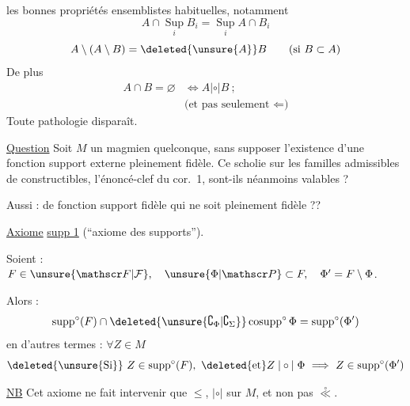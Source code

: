 \clearpage
{}

les bonnes propriétés  ensemblistes habituelles, notamment
\[
A\cap\operatorname*{Sup}_i B_i=\operatorname*{Sup}_i A\cap B_i
\]
\[
A\setminus(A\setminus B)=\deleted{\unsure{A}}B\qquad(\text{si }B\subset A)
\]
De plus 
\[
\begin{aligned}
A\cap B=\varnothing&\Longleftrightarrow A\mathrel{|\circ|}B\ ;\\
&\text{(et pas seulement }\Leftarrow\text{)}
\end{aligned}
\]
Toute pathologie disparaît.

\uline{Question} Soit $M$ un magmien quelconque, sans supposer l'existence d'une fonction support externe pleinement fidèle. Ce scholie sur les familles admissibles de  constructibles,   l'énoncé-clef du cor.\ 1, sont-ils néanmoins valables ?

Aussi :  de fonction support fidèle qui ne soit pleinement fidèle ??

\uline{Axiome} \uline{ supp 1} (``axiome des supports'').

\noindent\vrule\hspace{0.15em}\vrule\hspace{0.6em}\begin{minipage}{0.92\linewidth}
Soient : $F\in\unsure{\mathscr F|\mathcal F},\quad\unsure{\Phi|\mathscr P}\subset F,\quad\Phi'=F\setminus\Phi$.

Alors :
\[
\operatorname{supp}^{\circ}(F)\cap\deleted{\unsure{\complement_{\Phi}|\complement_{\Sigma}}}\operatorname{cosupp}^{\circ}\Phi=\operatorname{supp}^{\circ}(\Phi')
\]
en d'autres termes : $\forall Z\in M$
\[
\deleted{\unsure{\text{Si}}}\ Z\in\operatorname{supp}^{\circ}(F),\ \deleted{\text{et}}Z\mathrel{|\circ|}\Phi\ \Longrightarrow\ Z\in\operatorname{supp}^{\circ}(\Phi')
\]
\end{minipage}

\uline{NB} Cet axiome ne fait intervenir que $\leq$, $|\circ|$ sur $M$, et non pas $\overset{\circ}{\ll}$.
